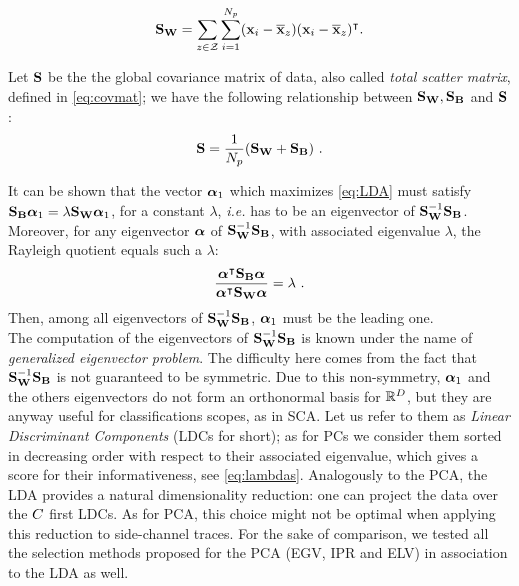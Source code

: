 \begin{equation}
\textbf{S}_{\textbf{W}} = \sum_{z\in\mathcal{Z}}\sum_{i=1}^{N_p}(\textbf{x}_i-\overline{\textbf{x}}_{z})(\textbf{x}_i-\overline{\textbf{x}}_{z})^\intercal \mbox{.}
\end{equation}


\begin{remark}
Let $\textbf{S}$ be the the global covariance matrix of data, also called {\em total scatter matrix}, defined in \eqref{eq:covmat}; we have the following relationship between $\textbf{S}_{\textbf{W}},\textbf{S}_{\textbf{B}}$ and $\textbf{S}$:
\begin{equation}
\textbf{S} = \frac{1}{N_p}(\textbf{S}_{\textbf{W}} + \textbf{S}_{\textbf{B}}) \mbox{ .}
\end{equation}
\end{remark}

It can be shown that the vector $\boldsymbol{\alpha}_1$ which maximizes \eqref{eq:LDA} must satisfy $\textbf{S}_{\textbf{B}}\boldsymbol{\alpha}_1 = \lambda \textbf{S}_{\textbf{W}} \boldsymbol{\alpha}_1$, for a constant $\lambda$, \textit{i.e.} has to be an eigenvector of $\textbf{S}_{\textbf{W}}^{-1} \textbf{S}_{\textbf{B}}$. Moreover, for any eigenvector $\boldsymbol{\alpha}$ of $\textbf{S}_{\textbf{W}}^{-1}\textbf{S}_{\textbf{B}}$, with associated eigenvalue $\lambda$, the Rayleigh quotient equals such a $\lambda$:
\begin{equation}\label{eq:lambdas}
\frac{\boldsymbol{\alpha}^\intercal \textbf{S}_{\textbf{B}} \boldsymbol{\alpha}}{\boldsymbol{\alpha}^\intercal \textbf{S}_{\textbf{W}} \boldsymbol{\alpha}} = \lambda \mbox{ .}
\end{equation}
Then, among all eigenvectors of $\textbf{S}_{\textbf{W}}^{-1} \textbf{S}_{\textbf{B}}$, $\boldsymbol{\alpha}_1$ must be the leading one.\\

The computation of the eigenvectors of $\textbf{S}_{\textbf{W}}^{-1} \textbf{S}_{\textbf{B}}$ is known under the name of {\em generalized eigenvector problem}. The difficulty here comes from the fact that $\textbf{S}_{\textbf{W}}^{-1} \textbf{S}_{\textbf{B}}$ is not guaranteed to be symmetric. Due to this non-symmetry,  $\boldsymbol{\alpha}_1$ and the others eigenvectors do not form an orthonormal basis for $\mathbb{R}^D$, but they are anyway useful for classifications scopes, as in SCA. Let us refer to them as {\em Linear Discriminant Components} (LDCs for short); as for PCs we consider them sorted in decreasing order with respect to their associated eigenvalue, which gives a score for their informativeness, see \eqref{eq:lambdas}. Analogously to the PCA, the LDA provides a natural dimensionality reduction: one can project the data over the $C$ first LDCs. As for PCA, this choice might not be optimal when applying this reduction to side-channel traces. For the sake of comparison, we tested all the selection methods proposed for the PCA (EGV, IPR and ELV) in association to the LDA as well.\\

